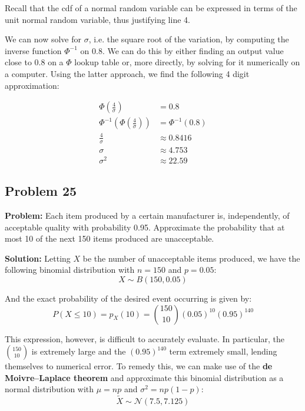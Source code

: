 \documentclass{article}
\begin{document}
Recall that the cdf of a normal random variable can be expressed in terms of the unit normal random variable, thus justifying line 4.

We can now solve for $\sigma$, i.e. the square root of the variation, by computing the inverse function $\Phi^{-1}$ on 0.8. We can do this by either finding an output value close to 0.8 on a $\Phi$ lookup table or, more directly, by solving for it numerically on a computer. Using the latter approach, we find the following 4 digit approximation:

\begin{align*}
    \Phi\left(\frac{4}{\sigma}\right)&=0.8\\
    \Phi^{-1}\left(\Phi\left(\frac{4}{\sigma}\right)\right)&=\Phi^{-1}\left(0.8\right)\\
    \frac{4}{\sigma}&\approx0.8416\tag{numerical approxmation}\\
    \sigma&\approx4.753\\
    \sigma^2&\approx22.59
\end{align*}

\subsection*{Problem 25}
\noindent\textbf{Problem:} Each item produced by a certain manufacturer is, independently, of acceptable quality with probability 0.95. Approximate the probability that at most 10 of the next 150 items produced are unacceptable.
\bigskip

\noindent\textbf{Solution:} Letting $X$ be the number of unacceptable items produced, we have the following binomial distribution with $n=150$ and $p=0.05$:
\begin{equation*}
    X\sim B(150,0.05)
\end{equation*}

And the exact probability of the desired event occurring is given by:
\begin{equation*}
    P(X\le10)=p_X(10)=\binom{150}{10}(0.05)^{10}(0.95)^{140}
\end{equation*}

This expression, however, is difficult to accurately evaluate. In particular, the $\binom{150}{10}$ is extremely large and the $(0.95)^{140}$ term extremely small, lending themselves to numerical error. To remedy this, we can make use of the \textbf{de Moivre–Laplace theorem} and approximate this binomial distribution as a normal distribution with $\mu=np$ and $\sigma^2=np(1-p)$:
\begin{equation*}
    \widetilde{X}\sim\mathcal N(7.5,7.125)
\end{equation*}
\end{document}
